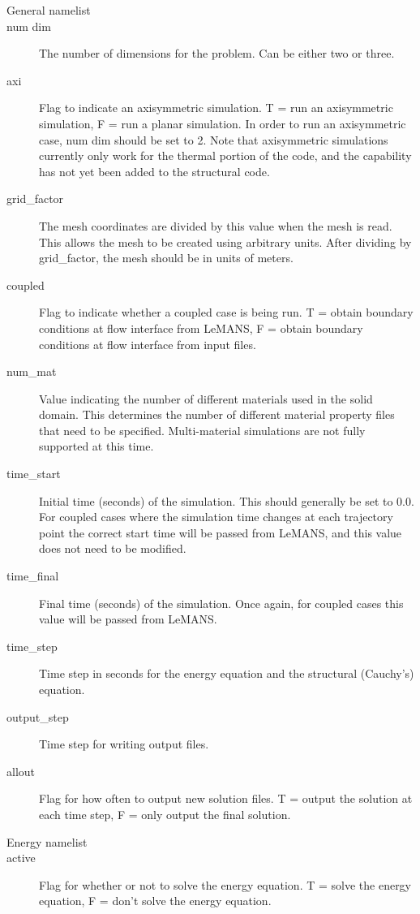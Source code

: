 \documentclass[]{article}
\begin{document}
\begin{description}
\item[General namelist]
\item [num dim] The number of dimensions for the problem. Can be either two or three.
\item [axi] Flag to indicate an axisymmetric simulation. T = run an axisymmetric simulation, F = run a planar simulation. In order to run an axisymmetric case, num dim should be set to 2.  Note that axisymmetric simulations currently only work for the thermal portion of the code, and the capability has not yet been added to the structural code.
\item [grid\_factor] The mesh coordinates are divided by this value when the mesh is read. This allows the mesh to be created using arbitrary units. After dividing by grid\_factor, the mesh should be in units of meters.
\item [coupled] Flag to indicate whether a coupled case is being run. T = obtain boundary conditions at
flow interface from LeMANS, F = obtain boundary conditions at flow interface from input files.
\item [num\_mat] Value indicating the number of different materials used in the solid domain. This determines the number of different material property files that need to be specified.  Multi-material simulations are not fully supported at this time.
\item [time\_start] Initial time (seconds) of the simulation. This should generally be set to 0.0. For coupled cases where the simulation time changes at each trajectory point the correct start time will be passed from LeMANS, and this value does not need to be modified.
\item [time\_final] Final time (seconds) of the simulation. Once again, for coupled cases this value will be passed from LeMANS.
\item [time\_step] Time step in seconds for the energy equation and the structural (Cauchy's) equation.
\item [output\_step] Time step for writing output files.
\item [allout] Flag for how often to output new solution files. T = output the solution at each time step, F = only output the final solution.
\\
\item[Energy namelist]
\item[active] Flag for whether or not to solve the energy equation. T = solve the energy equation, F = don't solve the energy equation. 

\end{description}
\end{document}
